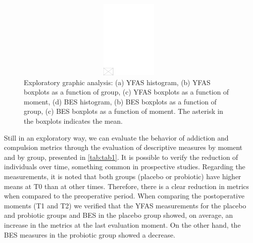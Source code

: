 \documentclass[AMA,STIX1COL]{WileyNJD-v2}
\begin{document}
\begin{figure}[h]
\centerline{\includegraphics[width=342pt,height=9pc,draft]{empty}}
\caption{Exploratory graphic analysis: (a) YFAS histogram, (b) YFAS boxplots as a function of group, (c) YFAS boxplots as a function of moment, (d) BES histogram, (b) BES boxplots as a function of group, (c) BES boxplots as a function of moment. The asterisk in the boxplots indicates the mean.\label{fig1}}
\end{figure}

Still in an exploratory way, we can evaluate the behavior of addiction and compulsion metrics through the evaluation of descriptive measures by moment and by group, presented in \autoref{tab:tab1}. It is possible to verify the reduction of individuals over time, something common in prospective studies. Regarding the measurements, it is noted that both groups (placebo or probiotic) have higher means at T0 than at other times. Therefore, there is a clear reduction in metrics when compared to the preoperative period. When comparing the postoperative moments (T1 and T2) we verified that the YFAS measurements for the placebo and probiotic groups and BES in the placebo group showed, on average, an increase in the metrics at the last evaluation moment. On the other hand, the BES measures in the probiotic group showed a decrease.
\end{document}
